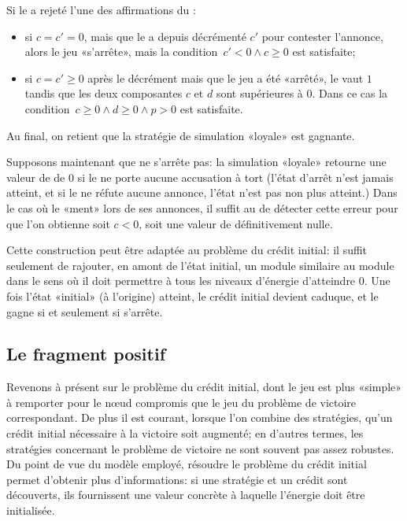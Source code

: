 Si le \ji a rejeté l'une des affirmations du \jo:
\begin{itemize}
\item si $c=c'=0$, mais que le \ji a depuis décrémenté $c'$ pour contester l'annonce, alors le jeu «s'arrête», mais la condition~$c'<0 \wedge c\geq0$ est satisfaite;
\item si $c=c'\geq0$ après le décrément mais que le jeu a été «arrêté», le  vaut $1$ tandis que les deux composantes $c$ et $d$ sont supérieures à $0$. Dans ce cas la condition~$c\geq0 \wedge d\geq0 \wedge p>0$ est satisfaite.
\end{itemize}

Au final, on retient que la stratégie de simulation «loyale» est gagnante.

\bigskip

Supposons maintenant que \machine ne s'arrête pas: la simulation «loyale» retourne une valeur de  de $0$ si le \ji ne porte aucune accusation à tort (l'état d'arrêt \tjhalt n'est jamais atteint, et si le \ji ne réfute aucune annonce, l'état \tjstopq n'est pas non plus atteint.)
Dans le cas où le \jo «ment» lors de ses annonces, il suffit au \ji de détecter cette erreur pour que l'on obtienne soit $c<0$, soit une valeur de  définitivement nulle.

\bigskip

Cette construction peut être adaptée au problème du crédit initial: il suffit seulement de rajouter, en amont de l'état initial, un module similaire au module \tjhalt dans le sens où il doit permettre à tous les niveaux d'énergie d'atteindre $0$.
Une fois l'état «initial» (à l'origine) atteint, le crédit initial devient caduque, et le \jo gagne si et seulement si \machine s'arrête.

\subsection{Le fragment positif}

Revenons à présent sur le problème du crédit initial, dont le jeu est plus «simple» à remporter pour le nœud compromis que le jeu du problème de victoire correspondant.
De plus il est courant, lorsque l'on combine des stratégies, qu'un crédit initial nécessaire à la victoire soit augmenté; en d'autres termes, les stratégies concernant le problème de victoire ne sont souvent pas assez robustes.
Du point de vue du modèle employé, résoudre le problème du crédit initial permet d'obtenir plus d'informations: si une stratégie et un crédit sont découverts, ils fournissent une valeur concrète à laquelle l'énergie doit être initialisée.

